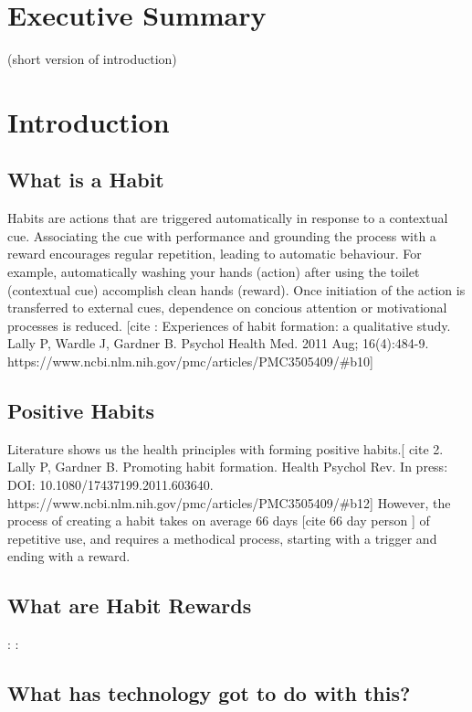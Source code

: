 

\section{Executive Summary}

(short version of introduction)


\section{Introduction}

\subsection*{What is a Habit}

Habits are actions that are triggered automatically in response to a contextual cue. Associating the cue with performance and grounding the process with a reward encourages regular repetition, leading to automatic behaviour. For example, automatically washing your hands (action) after using the toilet (contextual cue) accomplish clean hands (reward). Once initiation of the action is transferred to external cues, dependence on concious attention or motivational processes is reduced. [cite : Experiences of habit formation: a qualitative study. Lally P, Wardle J, Gardner B. Psychol Health Med. 2011 Aug; 16(4):484-9. https://www.ncbi.nlm.nih.gov/pmc/articles/PMC3505409/#b10]

\subsection*{Positive Habits}

Literature shows us the health principles with forming positive habits.[ cite 2. Lally P, Gardner B. Promoting habit formation. Health Psychol Rev. In press: DOI: 10.1080/17437199.2011.603640. https://www.ncbi.nlm.nih.gov/pmc/articles/PMC3505409/#b12] However, the process of creating a habit takes on average 66 days [cite 66 day person ] of repetitive use, and requires a methodical process, starting with a trigger and ending with a reward.

\subsection*{What are Habit Rewards}

:\newline
:

\subsection*{What has technology got to do with this?}

